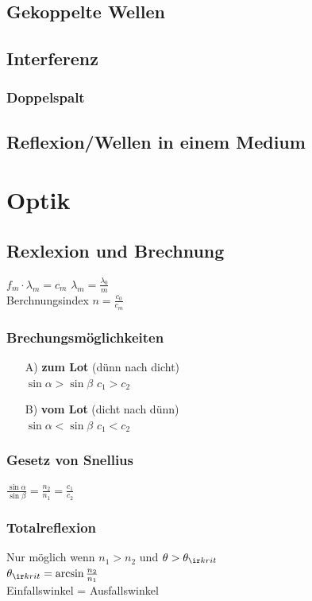\documentclass[german]{latex4ei/latex4ei_sheet}
\begin{document}
\subsection{Gekoppelte Wellen}
\subsection{Interferenz}
\subsubsection{Doppelspalt}
\subsection{Reflexion/Wellen in einem Medium}

\section{Optik}
\begin{sectionbox}
\subsection{Rexlexion und Brechnung}
$f_m \cdot \lambda_m = c_m$ \qquad
$\lambda_m = \frac{\lambda_0}{m}$\\
Berchnungsindex $n=\frac{c_0}{c_m}$
\subsubsection{Brechungsmöglichkeiten}
\begin{enumerate}
\item[A)] \textbf{zum Lot} (dünn nach dicht)\\
$\sin \alpha > \sin \beta$ \qquad $c_1 > c_2$
\item[B)] \textbf{vom Lot} (dicht nach dünn)\\
$\sin \alpha < \sin \beta$ \qquad $c_1 < c_2$
\end{enumerate}
\subsubsection{Gesetz von Snellius}
$\frac{\sin \alpha}{\sin \beta} = \frac{n_2}{n_1} = \frac {c_1}{c_2}$
\subsubsection{Totalreflexion}
Nur möglich wenn $n_1 > n_2$ und $\theta > \theta_{\ir krit}$ \\
$\theta_{\ir krit} = \arcsin \frac{n_2}{n_1}$\\
Einfallswinkel = Ausfallswinkel
\end{sectionbox}
\end{document}
